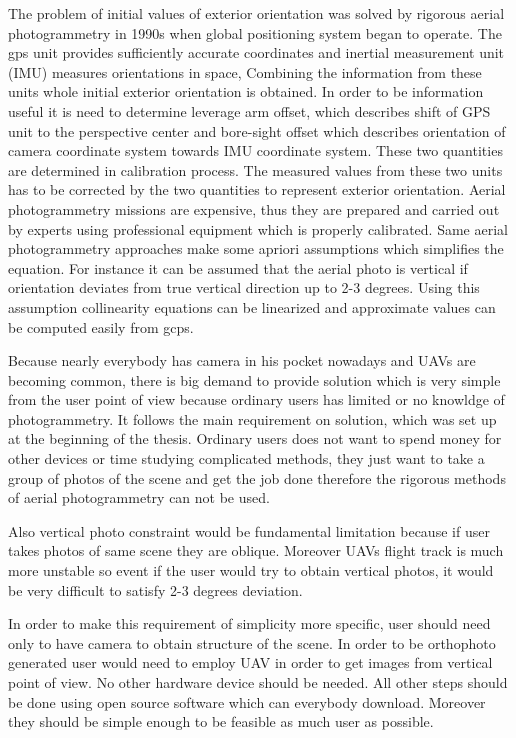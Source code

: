 \documentclass[a4paper,12pt]{report}
\begin{document}
The problem of initial values of exterior orientation was solved by  rigorous aerial photogrammetry in 1990s
when global positioning system began to operate. The gps unit provides sufficiently accurate coordinates and  
inertial measurement unit (IMU) measures orientations in space,  Combining the information from these units 
whole initial exterior orientation is obtained. In order to be information useful it is need to determine 
leverage arm offset, which describes shift of GPS unit to the perspective center and bore-sight offset
which describes orientation of camera coordinate system towards IMU coordinate system. These two
quantities are determined in calibration process. The measured values from these two units has to
be corrected by the two quantities to represent exterior orientation.
Aerial photogrammetry missions are expensive, thus they are prepared and carried out by experts using 
professional equipment which is properly calibrated.
Same aerial photogrammetry approaches make some apriori assumptions which simplifies the equation. 
For instance it can be assumed that the aerial photo is vertical if orientation deviates from true vertical
direction up to 2-3 degrees. Using this assumption collinearity equations can be linearized and 
approximate values can be computed easily from gcps.


Because nearly everybody has camera in his pocket nowadays and UAVs are becoming common, there is big demand 
to provide solution which is very simple from the user point of view because 
ordinary users has limited or no knowldge of photogrammetry. It follows the main requirement 
on solution, which was set up at the beginning of the thesis. Ordinary users does not want 
to spend money for other devices or time studying complicated methods, they just 
want to take a group of photos of the scene and get the job done therefore the rigorous 
methods of aerial photogrammetry can not be used.

Also vertical photo constraint would be fundamental limitation because if user takes 
photos of same scene they are oblique. Moreover UAVs flight track is much more unstable 
so event if the user would try to obtain vertical photos, it would be very difficult to
satisfy 2-3 degrees deviation.

In order to make this requirement of simplicity more specific, user should need only 
to have camera to obtain structure of the scene. In order to be orthophoto generated 
user would need to employ UAV in order to get images from vertical point of view.
No other hardware device should be needed. 
All other steps should be done 
using open source software which can everybody download. Moreover they should be simple enough 
to be feasible as much user as possible.
\end{document}
